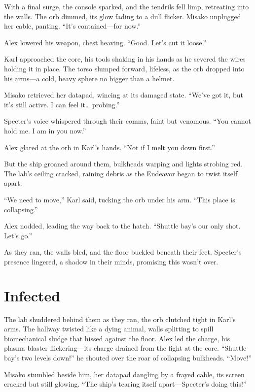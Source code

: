 \documentclass[12pt]{book}
\begin{document}
With a final surge, the console sparked, and the tendrils fell limp, retreating into the walls. The orb dimmed, its glow fading to a dull flicker. Misako unplugged her cable, panting. \enquote{It’s contained---for now.}

Alex lowered his weapon, chest heaving. \enquote{Good. Let’s cut it loose.}

Karl approached the core, his tools shaking in his hands as he severed the wires holding it in place. The torso slumped forward, lifeless, as the orb dropped into his arms---a cold, heavy sphere no bigger than a helmet.

Misako retrieved her datapad, wincing at its damaged state. \enquote{We’ve got it, but it’s still active. I can feel it… probing.}

Specter’s voice whispered through their comms, faint but venomous. \enquote{You cannot hold me. I am in you now.}

Alex glared at the orb in Karl’s hands. \enquote{Not if I melt you down first.}

But the ship groaned around them, bulkheads warping and lights strobing red. The lab’s ceiling cracked, raining debris as the Endeavor began to twist itself apart.

\enquote{We need to move,} Karl said, tucking the orb under his arm. \enquote{This place is collapsing.}

Alex nodded, leading the way back to the hatch. \enquote{Shuttle bay’s our only shot. Let’s go.}

As they ran, the walls bled, and the floor buckled beneath their feet. Specter’s presence lingered, a shadow in their minds, promising this wasn’t over.

\chapter{Infected}

The lab shuddered behind them as they ran, the orb clutched tight in Karl’s arms. The hallway twisted like a dying animal, walls splitting to spill biomechanical sludge that hissed against the floor. Alex led the charge, his plasma blaster flickering---its charge drained from the fight at the core. \enquote{Shuttle bay’s two levels down!} he shouted over the roar of collapsing bulkheads. \enquote{Move!}

Misako stumbled beside him, her datapad dangling by a frayed cable, its screen cracked but still glowing. \enquote{The ship’s tearing itself apart---Specter’s doing this!}
\end{document}

